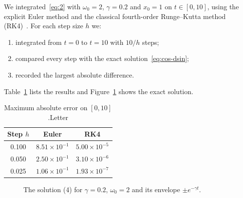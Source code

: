 \documentclass[11pt,a4paper]{article}
\begin{document}
We integrated~\eqref{eq:2} with $\omega_{0}=2$, $\gamma=0.2$ and $x_{0}=1$ on $t\in[0,10]$, using the explicit Euler method and the classical fourth-order Runge--Kutta method (RK4)~\cite{ref2}. For each step size $h$ we:
\begin{enumerate}
  \item integrated from $t=0$ to $t=10$ with $10/h$ steps;
  \item compared every step with the exact solution~\eqref{eq:cos-dsin};
  \item recorded the largest absolute difference.
\end{enumerate}
Table~\ref{tab:maximum-absolute} lists the results and Figure~\ref{fig:the-solution} shows the exact solution.

\begin{table}[htbp]
  \centering
  \caption{Maximum absolute error on $[0,10]$.Letter}
  \label{tab:maximum-absolute}
  \begin{tabular}{ccc}
    \toprule
    \textbf{Step $h$} & \textbf{Euler} & \textbf{RK4} \\
    \midrule
    0.100 & $8.51\times10^{-1}$ & $5.00\times10^{-5}$ \\
    0.050 & $2.50\times10^{-1}$ & $3.10\times10^{-6}$ \\
    0.025 & $1.06\times10^{-1}$ & $1.93\times10^{-7}$ \\
    \bottomrule
  \end{tabular}
\end{table}

\begin{figure}[htbp]
  \centering
  \caption{The solution (4) for $\gamma=0.2$, $\omega_{0}=2$ and its envelope $\pm e^{-\gamma t}$.}
  \label{fig:the-solution}
\end{figure}
\end{document}
